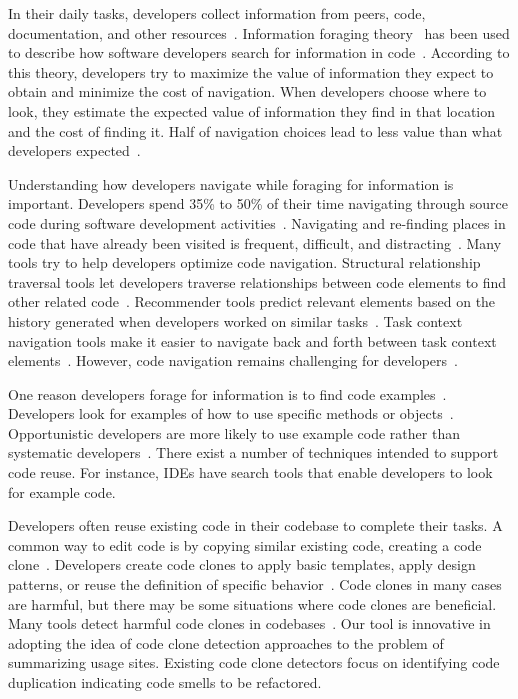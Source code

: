 \documentclass[conference]{IEEEtran}
\begin{document}
In their daily tasks, developers collect information from peers, code, documentation, and other resources~\cite{latoza2006maintaining}. Information foraging theory~\cite{pirolli1999informationforaging} has been used to describe how software developers search for information in code~\cite{fleming2013information}. According to this theory, developers try to maximize the value of information they expect to obtain and minimize the cost of navigation. When developers choose where to look, they estimate the expected value of information they find in that location and the cost of finding it. Half of navigation choices lead to less value than what developers expected~\cite{piorkowski2016foraging}. \par

Understanding how developers navigate while foraging for information is important. Developers spend 35\% to 50\% of their time navigating through source code during software development activities~\cite{ko2006exploratory,piorkowski2013whats}. Navigating and re-finding places in code that have already been visited is frequent, difficult, and distracting~\cite{ko2005eliciting,deline2005towards}. Many tools try to help developers optimize code navigation. Structural relationship traversal tools let developers traverse relationships between code elements to find other related code~\cite{karrer2011stacksplorer,augustine2015field,latoza2011visualizing}. Recommender tools predict relevant elements based on the history generated when developers worked on similar tasks~\cite{zimmermann2005mining,deline2005easing}. Task context navigation tools make it easier to navigate back and forth between task context elements~\cite{ko2006exploratory}. However, code navigation remains challenging for developers~\cite{albusays2017interviews}.\par

One reason developers forage for information is to find code examples~\cite{rosson1996reuse, brandt2009two}. Developers look for examples of how to use specific methods or objects~\cite{stylos2006mica,umarji2008archetypal}. Opportunistic developers are more likely to use example code rather than systematic developers~\cite{head2018not}. There exist a number of techniques intended to support code reuse. For instance, IDEs have search tools that enable developers to look for example code.\par

Developers often reuse existing code in their codebase to complete their tasks. A common way to edit code is by copying similar existing code, creating a code clone~\cite{codeCloneDetection2019,hou2009cnp}. Developers create code clones to apply basic templates, apply design patterns, or reuse the definition of specific behavior~\cite{kim2004ethnographic,kapser2008cloning}. Code clones in many cases are harmful, but there may be some situations where code clones are beneficial.  Many tools detect harmful code clones in codebases~\cite{bellon2007comparison}. Our tool is innovative in adopting the idea of code clone detection approaches to the problem of summarizing usage sites. Existing code clone detectors focus on identifying code duplication indicating code smells to be refactored.\par
\end{document}
